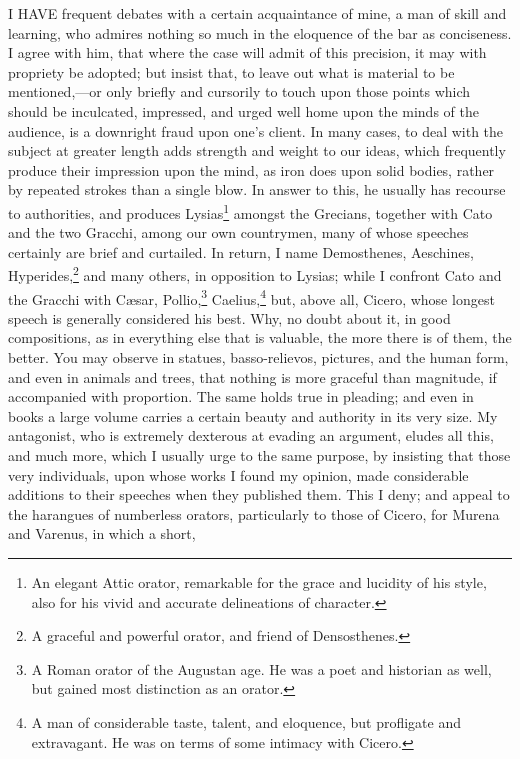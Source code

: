 
I HAVE frequent debates with a certain acquaintance of mine, a man of
skill and learning, who admires nothing so much in the eloquence of the
bar as conciseness. I agree with him, that where the case will admit of
this precision, it may with propriety be adopted; but insist that, to
leave out what is material to be mentioned,—or only briefly and
cursorily to touch upon those points which should be inculcated,
impressed, and urged well home upon the minds of the audience, is a
downright fraud upon one's client. In many cases, to deal with the subject
at greater length adds strength and weight to our ideas, which frequently
produce their impression upon the mind, as iron does upon solid bodies,
rather by repeated strokes than a single blow. In answer to this, he
usually has recourse to authorities, and produces Lysias\footnote{An elegant Attic orator,
remarkable for the grace and lucidity of his style, also for his vivid and
accurate delineations of character.}
amongst the Grecians, together with Cato and the two Gracchi, among our
own countrymen, many of whose speeches certainly are brief and curtailed.
In return, I name Demosthenes, Aeschines, Hyperides,\footnote{A graceful and powerful
orator, and friend of Densosthenes.} and many others, in
opposition to Lysias; while I confront Cato and the Gracchi with Cæsar,
Pollio,\footnote{A Roman orator of the
Augustan age. He was a poet and historian as well, but gained most
distinction as an orator.}
Caelius,\footnote{A man of considerable
taste, talent, and eloquence, but profligate and extravagant. He was on
terms of some intimacy with Cicero.}
but, above all, Cicero, whose longest speech is generally considered his
best. Why, no doubt about it, in good compositions, as in everything else
that is valuable, the more there is of them, the better. You may observe
in statues, basso-relievos, pictures, and the human form, and even in
animals and trees, that nothing is more graceful than magnitude, if
accompanied with proportion. The same holds true in pleading; and even in
books a large volume carries a certain beauty and authority in its very
size. My antagonist, who is extremely dexterous at evading an argument,
eludes all this, and much more, which I usually urge to the same purpose,
by insisting that those very individuals, upon whose works I found my
opinion, made considerable additions to their speeches when they published
them. This I deny; and appeal to the harangues of numberless orators,
particularly to those of Cicero, for Murena and Varenus, in which a short,
